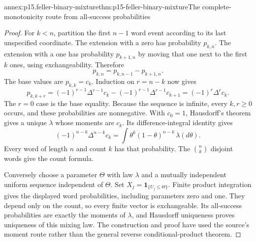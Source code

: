 \begin{annexitem}{annex:p15.feller-binary-mixture}{thm:p15-feller-binary-mixture}{The complete-monotonicity route from all-success probabilities}
\begin{proof}
For \(k<n\), partition the first \(n-1\) word event according to its
last unspecified coordinate. The extension with a zero has probability
\(p_{k,n}\). The extension with a one has probability \(p_{k+1,n}\)
by moving that one next to the first \(k\) ones, using exchangeability.
Therefore
\[
                             p_{k,n}=p_{k,n-1}-p_{k+1,n}.
\]
The base values are \(p_{k,k}=c_k\).
Induction on \(r=n-k\) now gives
\[
 p_{k,k+r}
    =(-1)^{r-1}\Delta^{r-1}c_k
       -(-1)^{r-1}\Delta^{r-1}c_{k+1}
    =(-1)^r\Delta^r c_k.
\]
The \(r=0\) case is the base equality.
Because the sequence is infinite, every \(k,r\geq0\) occurs, and
these probabilities are nonnegative. With \(c_0=1\), Hausdorff's
theorem gives a unique \(\lambda\) whose moments are \(c_k\).
Its difference-integral identity gives
\[
                 (-1)^{n-k}\Delta^{n-k}c_k
                         =\int\theta^k(1-\theta)^{n-k}\,\lambda(d\theta).
\]
Every word of length \(n\) and count \(k\) has that probability.
The \(\binom nk\) disjoint words give the count formula.

Conversely choose a parameter \(\Theta\) with law \(\lambda\) and
a mutually independent uniform sequence independent of \(\Theta\).
Set \(X_j=\mathbf1_{\{U_j\leq\Theta\}}\).
Finite product integration gives the displayed word probabilities,
including parameters zero and one. They depend only on the count,
so every finite vector is exchangeable.
Its all-success probabilities are exactly the moments of \(\lambda\),
and Hausdorff uniqueness proves uniqueness of this mixing law.
The construction and proof have used the source's moment route rather
than the general reverse conditional-product theorem.
\end{proof}
\end{annexitem}

